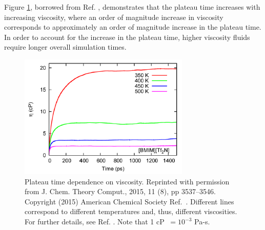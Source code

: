 \documentclass[9pt,bestpractices]{livecoms}
\begin{document}
Figure \ref{fig:ZhangFig10}, borrowed from Ref. \cite{Zhang2015}, demonstrates that the plateau time increases with increasing viscosity, where an order of magnitude increase in viscosity corresponds to approximately an order of magnitude increase in the plateau time. In order to account for the increase in the plateau time, higher viscosity fluids require longer overall simulation times.

\begin{figure}[htb!]
	\centering
	\includegraphics[width=3.2in]{ZhangFig10.png}
	\caption{Plateau time dependence on viscosity. Reprinted with permission from J. Chem. Theory Comput., 2015, 11 (8), pp 3537–3546. Copyright (2015) American Chemical Society Ref.\ \cite{Zhang2015}. Different lines correspond to different temperatures and, thus, different viscosities. For further details, see Ref. \cite{Zhang2015}. Note that 1 cP $\ = 10^{-3}$ Pa-s.}
	\label{fig:ZhangFig10}
\end{figure}


\end{document}
